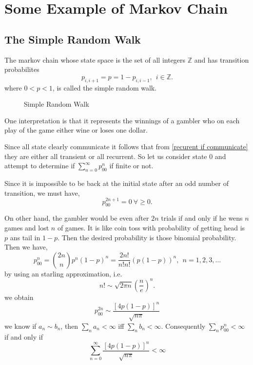 \chapter{Some Example of Markov Chain}
\section{The Simple Random Walk}
The markov chain whose state space is the set of all integers $ \mathds{Z} $ and has transition probabilites
\[
    p_{i,i+1} = p = 1-p_{i,i-1}, \ \ i\in\mathds{Z}.
\]
where $ 0<p<1 $, is called the simple random walk.

\begin{figure}[h]
    \centering
    \caption{Simple Random Walk}
    \label{Simple random walk}
\end{figure}

One interpretation is that it represents the winnings of a gambler who on each play of the game either wine or loses one dollar.

Since all state clearly communicate it follows that from \cref{recurent if communicate} they are either all transient or all recurrent. 
So let us consider state 0 and
attempt to determine if  $ \sum_{n=0}^{\infty} p_{00}^{n} $ if finite or not.

Since it is impossible to be back at the initial state after an odd number of transition, we must have,
\[
    p^{2n+1}_{00} = 0 \ \forall \ge 0.
\]

On other hand, the gambler would be even after $ 2n $ trials if and only if he wens  $ n $ games and lost  $ n $ of games.
It is like coin toss with probability of getting head is $ p $ ans tail in  $ 1-p $. Then the desired probability is those binomial probability.
Then we have,
 \[
     p^{n}_{00} = \binom{2n}{n}p^{n}(1-p)^{n} = \frac{2n!}{n!n!}(p(1-p))^{n}, \ \ n=1,2,3,\ldots
\]
by using an starling approximation,
i.e.
\[
    n! \sim \sqrt{2\pi n}\left(\frac{n}{e}\right)^{n}.
\]
we obtain 
\[
    p^{2n}_{00}\sim \frac{[4p(1-p)]^{n}}{\sqrt{n\pi}}
\]
we know if $ a_{n}\sim b_{n} $, then $ \sum_{n}a_{n}<\infty  $ iff $ \sum_{n}b_{n}<\infty  $. Consequently $ \sum_{n}p^{n}_{00}<\infty  $ 
if and only if
\[
    \sum_{n=0}^{\infty} \frac{[4p(1-p)]^{n}}{\sqrt{n\pi}} < \infty
\]

